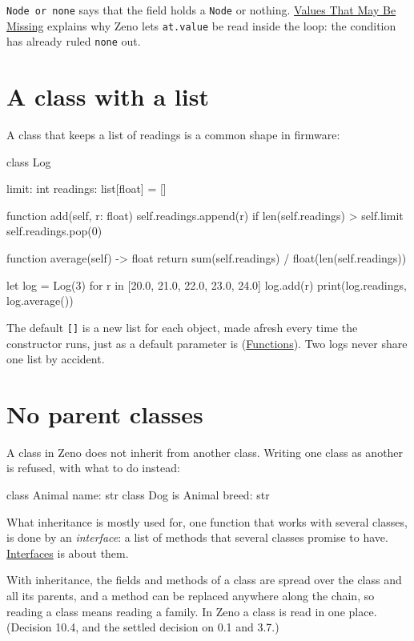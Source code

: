 \verb|Node or none| says that the field holds a \verb|Node| or nothing.
\hyperref[ch-none]{Values That May Be Missing} explains why Zeno lets
\verb|at.value| be read inside the loop: the condition has already
ruled \verb|none| out.

\section{A class with a list}

A class that keeps a list of readings is a common shape in firmware:

\begin{zeno}[file=log.zeno]
class Log {
    limit: int
    readings: list[float] = []

    function add(self, r: float) {
        self.readings.append(r)
        if len(self.readings) > self.limit {
            self.readings.pop(0)
        }
    }

    function average(self) -> float {
        return sum(self.readings) / float(len(self.readings))
    }
}

let log = Log(3)
for r in [20.0, 21.0, 22.0, 23.0, 24.0] {
    log.add(r)
}
print(log.readings, log.average())
\end{zeno}

The default \verb|[]| is a new list for each object, made afresh every
time the constructor runs, just as a default parameter is
(\hyperref[ch-functions]{Functions}). Two logs never share one list by
accident.

\section{No parent classes}

A class in Zeno does not inherit from another class. Writing one class
as another is refused, with what to do instead:

\begin{zeno}[fails=yes]
class Animal {
    name: str
}
class Dog is Animal {
    breed: str
}
\end{zeno}

What inheritance is mostly used for, one function that works with
several classes, is done by an \emph{interface}: a list of methods
that several classes promise to have. \hyperref[ch-interfaces]{Interfaces}
is about them.

\begin{why}
With inheritance, the fields and methods of a class are spread over
the class and all its parents, and a method can be replaced anywhere
along the chain, so reading a class means reading a family. In Zeno a
class is read in one place. (Decision 10.4, and the settled decision
on 0.1 and 3.7.)
\end{why}

